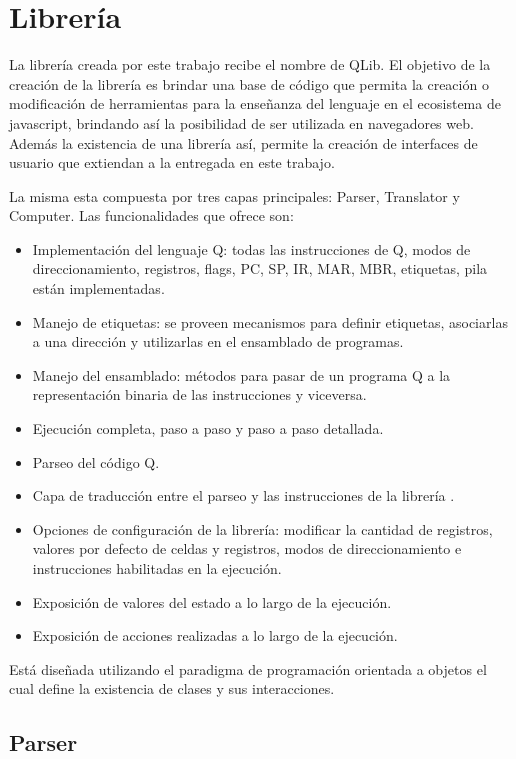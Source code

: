 \section{Librería}
\label{qlib}

La librería creada por este trabajo recibe el nombre de QLib. El objetivo de la creación de la librería es brindar una base de código que permita
la creación o modificación de herramientas para la enseñanza del lenguaje en el ecosistema de javascript, brindando así la posibilidad de ser
utilizada en navegadores web.
Además la existencia de una librería así, permite la creación de interfaces de usuario que extiendan a la entregada en este trabajo.

La misma esta compuesta por tres capas principales: Parser, Translator y Computer. Las funcionalidades que ofrece son:

\begin{itemize}
  \item Implementación del lenguaje Q: todas las instrucciones de Q, modos de direccionamiento, registros, flags, PC, SP, IR, MAR, MBR, etiquetas, pila están implementadas.
  \item Manejo de etiquetas: se proveen mecanismos para definir etiquetas, asociarlas a una dirección y utilizarlas en el ensamblado de programas.
  \item Manejo del ensamblado: métodos para pasar de un programa Q a la representación binaria de las instrucciones y viceversa.
  \item Ejecución completa, paso a paso y paso a paso detallada.
  \item Parseo del código Q.
  \item Capa de traducción entre el parseo y las instrucciones de la librería . 
  \item Opciones de configuración de la librería: modificar la cantidad de registros, valores por defecto de celdas y registros, modos de direccionamiento e instrucciones habilitadas en la ejecución.
  \item Exposición de valores del estado a lo largo de la ejecución.
  \item Exposición de acciones realizadas a lo largo de la ejecución.
\end{itemize}

Está diseñada utilizando el paradigma de programación orientada a objetos el cual define la existencia de clases y sus interacciones. 

\subsection{Parser}

